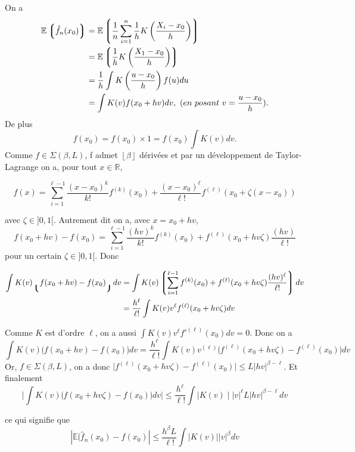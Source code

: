 \documentclass[
]{book}
\begin{document}
\begin{demo} On a
$$
\begin{aligned}
\mathbb E\left\lgroup \hat f_n(x_0) \right\rgroup&=\mathbb E\left\lgroup\frac{1}{n}\sum_{i=1}^n \frac{1}{h}K\left(\frac{X_i-x_0}{h}\right)\right\rgroup \\
&=\mathbb E\left\lgroup \frac{1}{h}K\left(\frac{X_1-x_0}{h}\right)\right\rgroup \\
&=\frac{1}{h}\int K\left(\frac{u-x_0}{h}\right)f(u)du  \\
&=\int K(v)f(x_0+hv)dv,\  (en\ posant\ v=\frac{u-x_0}{h}).
\end{aligned}
$$
De plus
$$
f(x_0)=f(x_0)\times 1 = f(x_0) \int K(v)dv.
$$
Comme $f \in \Sigma(\beta, L)$, f admet $\left\lfloor{\beta} \right \rfloor$ dérivées et par un développement de Taylor-Lagrange on a, pour tout $x \in \mathbb R$,

$$
f(x)= \sum_{i=1}^{\ell-1}\frac{(x-x_0)^k}{k!}f^{(k)}(x_0)+\frac{(x-x_0)^\ell}{\ell!}f^{(\ell)}(x_0+\zeta (x-x_0))
$$  

avec $\zeta \in ]0,1[$. Autrement dit on a, avec $x= x_0+hv$,
$$
f(x_0+hv)-f(x_0)=\sum_{i=1}^{\ell-1}\frac{(hv)^k}{k!}f^{(k)}(x_0)+f^{(\ell)}(x_0+hv\zeta)\frac{(hv)}{\ell !}
$$  
pour un certain $\zeta \in ]0,1[$. Donc


$$
\begin{aligned}
\int K(v)\lgroup f(x_0+hv)-f(x_0)\rgroup dv &= \int K(v)\left\lgroup\sum_{i=1}^{\ell - 1}f^{(k)}(x_0)+f^{(\ell)}(x_0+hv\zeta)\frac{(hv)^{\ell}}{\ell !}\right\rgroup dv \\
&=\frac{h^{\ell}}{\ell !}\int K(v)v^{\ell}f^{(\ell)}(x_0+hv\zeta)dv
\end{aligned}
$$

Comme $K$ est d'ordre $\ell$, on a aussi $\int K(v)v^{\ell}f'^{(\ell)}(x_0)dv=0$. Donc on a
$$
\int K(v)\lgroup f(x_0+hv)-f(x_0)\rgroup dv = \frac{h^{\ell}}{\ell !}\int K(v)v^{(\ell)}\lgroup f^{(\ell)}(x_0 + hv\zeta)-f^{(\ell)}(x_0)\rgroup dv
$$
Or, $f \in \Sigma(\beta, L)$, on a donc $\mid f^{(\ell)}(x_0+hv\zeta)-f^{(\ell)}(x_0)\mid \leq L|hv|^{\beta-\ell}$. Et finalement
$$
\mid \int K(v)\lgroup f(x_0+hv\zeta)-f(x_0)\rgroup dv \mid \leq \frac{h^{\ell}}{\ell !}\int \mid K(v) \mid |v|^{\ell}L|hv|^{\beta-\ell}dv
$$

ce qui signifie que
$$
|\mathbb E \lgroup\hat f_n(x_0)-f(x_0)| \leq \frac{h^{\beta}L}{\ell !}\int |K(v)||v|^{\beta}dv
$$
\end{demo}
\end{document}
